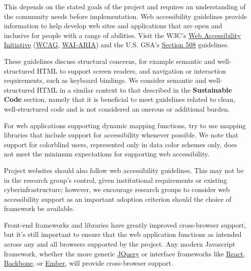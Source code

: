 \documentclass{article}
\newcounter{subsubsubsection}[subsubsection]
\begin{document}
This depends on the stated goals of the project and requires an understanding of the community needs before implementation. 
Web accessibility guidelines provide information to help develop web sites and applications that are open and inclusive for people with a range of abilities. Visit the W3C’s \href{https://www.w3.org/standards/webdesign/accessibility#wai} {Web Accessibility Initiative} (\href{https://www.w3.org/standards/techs/wcag#w3c_all} {WCAG}, \href{https://www.w3.org/WAI/intro/aria.php} {WAI-ARIA}) and the U.S. GSA’s \href{https://section508.gov/content/learn/best-practice-library} {Section 508} guidelines.
 
These guidelines discuss structural concerns, for example semantic and well-structured HTML to support screen readers, and navigation or interaction requirements, such as keyboard bindings. We consider semantic and well-structured HTML in a similar context to that described in the \textbf{Sustainable Code} section, namely that it is beneficial to meet guidelines related to clean, well-structured code and is not considered an onerous or additional burden.
 
For web applications supporting dynamic mapping functions, try to use mapping libraries that include support for accessibility whenever possible. We note that support for colorblind users, represented only in data color schemes only, does not meet the minimum expectations for supporting web accessibility. 
 
Project websites should also follow web accessibility guidelines. This may not be in the research group’s control, given institutional requirements or existing cyberinfrastructure; however, we encourage research groups to consider web accessibility support as an important adoption criterion should the choice of framework be available.

Front-end frameworks and libraries have greatly improved cross-browser support, but it’s still important to ensure that the web application functions as intended across any and all browsers supported by the project. Any modern Javascript framework, whether the more generic \href{https://jquery.com/} {JQuery} or interface frameworks like \href{https://facebook.github.io/react/} {React}, \href{http://backbonejs.org/} {Backbone}, or \href{http://emberjs.com/} {Ember}, will provide cross-browser support.
 
\end{document}
